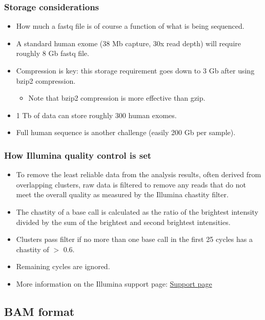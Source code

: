 \documentclass{beamer}
\begin{document}
\begin{frame}
  \frametitle{Storage considerations}
  \begin{itemize}
  \item How much a fastq file is of course a function of what is being sequenced.
  \item A standard human exome (38 Mb capture, 30x read depth) will require roughly 8 Gb fastq file.
  \item Compression is key: this storage requirement goes down to 3 Gb after using bzip2 compression.
    \begin{itemize}
    \item Note that bzip2 compression is more effective than gzip.
    \end{itemize}
  \item 1 Tb of data can store roughly 300 human exomes.
  \item Full human sequence is another challenge (easily 200 Gb per sample).
  \end{itemize}
\end{frame}


\begin{frame}
  \frametitle{How Illumina quality control is set}
  \begin{itemize}
  \item To remove the least reliable data from the analysis results, often derived from overlapping clusters, raw data is filtered to remove any reads that do not meet the overall quality as measured by the Illumina chastity filter. 
  \item The chastity of a base call is calculated as the ratio of the brightest intensity divided by the sum of the brightest and second brightest intensities.
  \item Clusters pass filter if no more than one base call in the first 25 cycles has a chastity of $>$ 0.6.
  \item Remaining cycles are ignored.
  \item More information on the Illumina support page: \href{http://support.illumina.com/sequencing/sequencing_software/real-time_analysis_rta/questions.ilmn}{Support page}
  \end{itemize}
\end{frame}


\subsection{BAM format}
\end{document}
